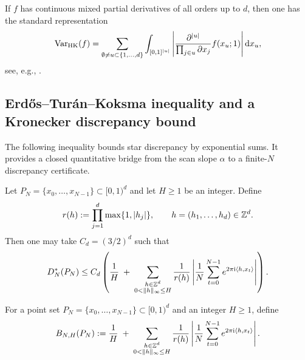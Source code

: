 \begin{remark}
\label{rem:hk_smooth_representation}
If $f$ has continuous mixed partial derivatives of all orders up to $d$, then one has the standard representation
\begin{equation}
\label{eq:hk_smooth_rep}
\mathrm{Var}_{\mathrm{HK}}(f)
=
\sum_{\emptyset\neq u\subset\{1,\dots,d\}}
\int_{[0,1]^{|u|}}
\left|
\frac{\partial^{|u|}}{\prod_{j\in u}\partial x_j}
f(x_u;1)
\right|
\mathrm{d} x_u,
\end{equation}
see, e.g., \cite{Niederreiter1992,DickPillichshammer2010}.
\end{remark}

\subsection{Erd\H{o}s--Tur\'an--Koksma inequality and a Kronecker discrepancy bound}
\label{app:etk_kronecker_bound}

The following inequality bounds star discrepancy by exponential sums. It provides a closed quantitative bridge from the scan slope $\alpha$ to a finite-$N$ discrepancy certificate.

\begin{theorem}
\label{thm:etk}
Let $P_N=\{x_0,\dots,x_{N-1}\}\subset[0,1)^d$ and let $H\ge 1$ be an integer. Define
\[
r(h):=\prod_{j=1}^d \max\{1,|h_j|\},\qquad h=(h_1,\dots,h_d)\in\mathbb{Z}^d.
\]
Then one may take $C_d=(3/2)^d$ such that
\begin{equation}
\label{eq:etk}
D_N^\ast(P_N)
\le
C_d\left(
\frac{1}{H}
\;+\;
\sum_{\substack{h\in\mathbb{Z}^d\\0<\|h\|_\infty\le H}}
\frac{1}{r(h)}
\left|
\frac{1}{N}\sum_{t=0}^{N-1} e^{2\pi \mathrm{i} \langle h,x_t\rangle}
\right|
\right).
\end{equation}
\end{theorem}

\begin{definition}
\label{def:etk_bracket}
For a point set $P_N=\{x_0,\dots,x_{N-1}\}\subset[0,1)^d$ and an integer $H\ge 1$, define
\begin{equation}
\label{eq:etk_bracket_def}
B_{N,H}(P_N)
:=
\frac{1}{H}
\;+\;
\sum_{\substack{h\in\mathbb{Z}^d\\0<\|h\|_\infty\le H}}
\frac{1}{r(h)}
\left|
\frac{1}{N}\sum_{t=0}^{N-1} e^{2\pi \mathrm{i} \langle h,x_t\rangle}
\right|.
\end{equation}
\end{definition}

